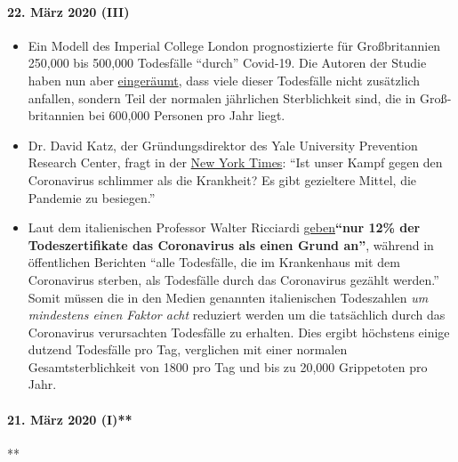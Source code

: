 \hypertarget{22-muxe4rz-2020-iii}{%
\paragraph{22. März 2020 (III)}\label{22-muxe4rz-2020-iii}}

\begin{itemize}
\tightlist
\item
  Ein Modell des Imperial College London prognostizierte für
  Großbritannien 250,000 bis 500,000 Todesfälle ``durch'' Covid-19. Die
  Autoren der Studie haben nun aber
  \href{https://www.bbc.com/news/health-51979654}{eingeräumt}, dass
  viele dieser Todesfälle nicht zusätzlich anfallen, sondern Teil der
  normalen jährlichen Sterblichkeit sind, die in Groß­britannien bei
  600,000 Personen pro Jahr liegt.
\item
  Dr. David Katz, der Gründungsdirektor des Yale University Prevention
  Research Center, fragt in der
  \href{https://www.nytimes.com/2020/03/20/opinion/coronavirus-pandemic-social-distancing.html}{New
  York Times}: ``Ist unser Kampf gegen den Coronavirus schlimmer als die
  Krankheit? Es gibt gezieltere Mittel, die Pandemie zu besiegen.''
\item
  Laut dem italienischen Professor Walter Ricciardi
  \href{https://web.archive.org/web/20200324214448/https://www.telegraph.co.uk/global-health/science-and-disease/have-many-coronavirus-patients-died-italy/}{geben}\textbf{``nur
  12\% der Todes­zertifikate das Coronavirus als einen Grund an''},
  während in öffentlichen Berichten ``alle Todesfälle, die im
  Krankenhaus mit dem Coronavirus sterben, als Todesfälle durch das
  Coronavirus gezählt werden.'' Somit müssen die in den Medien genannten
  italienischen Todeszahlen \emph{um mindestens einen Faktor acht}
  reduziert werden um die tatsächlich durch das Coronavirus verursachten
  Todesfälle zu erhalten. Dies ergibt höchstens einige dutzend
  Todesfälle pro Tag, verglichen mit einer normalen Gesamtsterblichkeit
  von 1800 pro Tag und bis zu 20,000 Grippetoten pro Jahr.
\end{itemize}

\hypertarget{21-muxe4rz-2020-i}{%
\paragraph{21. März 2020 (I)**}\label{21-muxe4rz-2020-i}}

**

